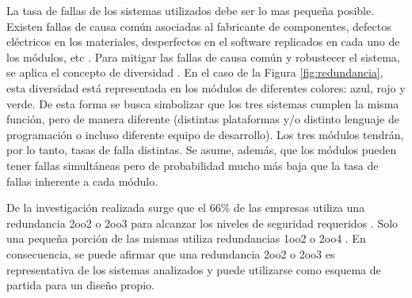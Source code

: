 	La tasa de fallas de los sistemas utilizados debe ser lo mas pequeña posible. Existen fallas de causa común asociadas al fabricante de componentes, defectos eléctricos en los materiales, desperfectos en el software replicados en cada uno de los módulos, etc \cite{Paper_30,Paper_32,Paper_42,Paper_47,Paper_77,Paper_83,Paper_84,Paper_118,Paper_122,Paper_124,Paper_125,Paper_127,Paper_131,Paper_132,Paper_136,Paper_138,Paper_140}. Para mitigar las fallas de causa común y robustecer el sistema, se aplica el concepto de diversidad \cite{Paper_53,Paper_125,Paper_131,Paper_132,Paper_140,Paper_171}. En el caso de la Figura \ref{fig:redundancia}, esta diversidad está representada en los módulos de diferentes colores: azul, rojo y verde. De esta forma se busca simbolizar que los tres sistemas cumplen la misma función, pero de manera diferente (distintas plataformas y/o distinto lenguaje de programación o incluso diferente equipo de desarrollo). Los tres módulos tendrán, por lo tanto, tasas de falla distintas. Se asume, además, que los módulos pueden tener fallas simultáneas pero de probabilidad mucho más baja que la tasa de fallas inherente a cada módulo.
	
	De la investigación realizada surge que el 66\% de las empresas utiliza una redundancia 2oo2 o 2oo3 para alcanzar los niveles de seguridad requeridos \cite{SIEMENS,ALSTOM,HITACHI,THALES,BOMBARDIER,KYOSAN,HIMA,CRRC,CAF,TRANSMASHHOLDING,HYUNDAI,GENERAL,CATERPILLAR,STADLER}. Solo una pequeña porción de las mismas utiliza redundancias 1oo2 \cite{ALSTOM} o 2oo4 \cite{HITACHI}. En consecuencia, se puede afirmar que una redundancia 2oo2 o 2oo3 es representativa de los sistemas analizados y puede utilizarse como esquema de partida para un diseño propio.